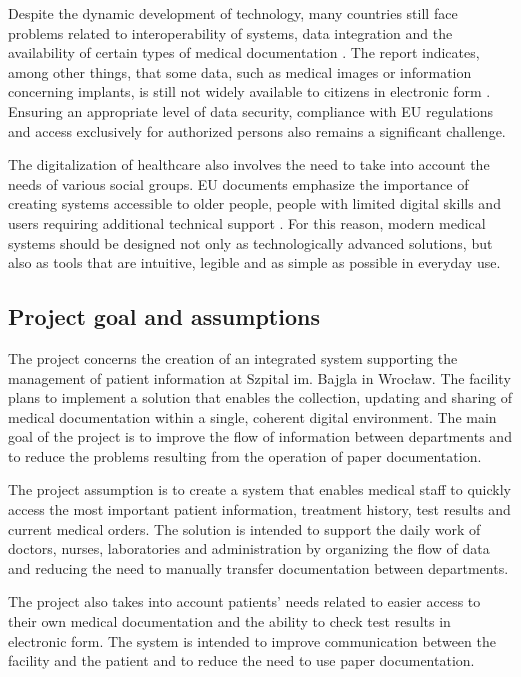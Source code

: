 Despite the dynamic development of technology, many countries still face problems related to interoperability of systems, data integration and the availability of certain types of medical documentation \cite{EU_eHealth_2024}. The report indicates, among other things, that some data, such as medical images or information concerning implants, is still not widely available to citizens in electronic form \cite{EU_eHealth_2024}. Ensuring an appropriate level of data security, compliance with EU regulations and access exclusively for authorized persons also remains a significant challenge.

The digitalization of healthcare also involves the need to take into account the needs of various social groups. EU documents emphasize the importance of creating systems accessible to older people, people with limited digital skills and users requiring additional technical support \cite{EU_eHealth_2024}. For this reason, modern medical systems should be designed not only as technologically advanced solutions, but also as tools that are intuitive, legible and as simple as possible in everyday use.

\subsection{Project goal and assumptions}

The project concerns the creation of an integrated system supporting the management of patient information at Szpital im. Bajgla in Wrocław. The facility plans to implement a solution that enables the collection, updating and sharing of medical documentation within a single, coherent digital environment. The main goal of the project is to improve the flow of information between departments and to reduce the problems resulting from the operation of paper documentation.

The project assumption is to create a system that enables medical staff to quickly access the most important patient information, treatment history, test results and current medical orders. The solution is intended to support the daily work of doctors, nurses, laboratories and administration by organizing the flow of data and reducing the need to manually transfer documentation between departments.

The project also takes into account patients' needs related to easier access to their own medical documentation and the ability to check test results in electronic form. The system is intended to improve communication between the facility and the patient and to reduce the need to use paper documentation.

